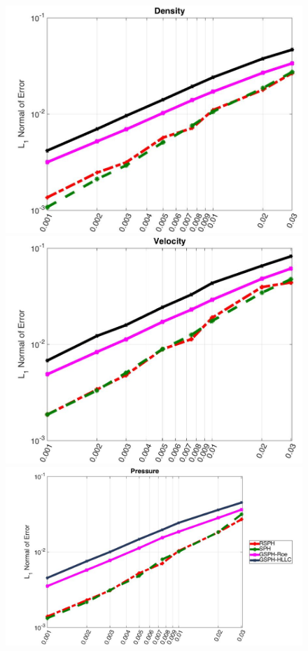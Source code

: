 \documentclass[review]{elsarticle}
\begin{document}
\begin{figure}[H]
    \centering
    \begin{minipage}{.332\textwidth}
        \centering
        \includegraphics[width=0.99 \textwidth]{./Figures/Accuracy-des}
    \end{minipage}%
    \begin{minipage}{.332 \textwidth}
        \centering
        \includegraphics[width=0.99 \textwidth]{./Figures/Accuracy-vel}
    \end{minipage}%
    \begin{minipage}{.332\textwidth}
        \centering
        \includegraphics[width=0.99 \textwidth]{./Figures/Accuracy-pre}

\end{minipage}
\end{figure}
\end{document}
